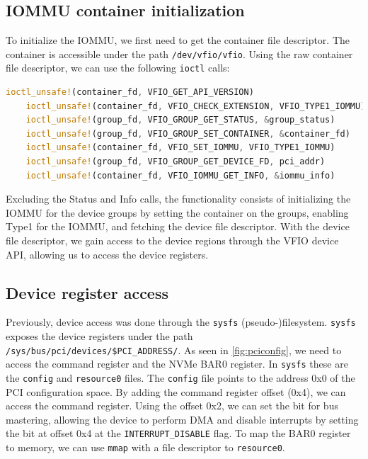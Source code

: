 \subsection{IOMMU container initialization}\label{sec:iommuinit}
To initialize the IOMMU, we first need to get the container file descriptor. The container is accessible under the path \texttt{/dev/vfio/vfio}. Using the raw container file descriptor, we can use the following \texttt{ioctl} calls:

\begin{lstlisting}[language=Rust, caption={\texttt{ioctl} calls needed for IOMMU initialization}, label=lst:containerioctls]
    ioctl_unsafe!(container_fd, VFIO_GET_API_VERSION)
    ioctl_unsafe!(container_fd, VFIO_CHECK_EXTENSION, VFIO_TYPE1_IOMMU)
    ioctl_unsafe!(group_fd, VFIO_GROUP_GET_STATUS, &group_status)
    ioctl_unsafe!(group_fd, VFIO_GROUP_SET_CONTAINER, &container_fd)
    ioctl_unsafe!(container_fd, VFIO_SET_IOMMU, VFIO_TYPE1_IOMMU)
    ioctl_unsafe!(group_fd, VFIO_GROUP_GET_DEVICE_FD, pci_addr)
    ioctl_unsafe!(container_fd, VFIO_IOMMU_GET_INFO, &iommu_info)   
\end{lstlisting}

Excluding the Status and Info calls, the functionality consists of initializing the IOMMU for the device groups by setting the container on the groups, enabling Type1 for the IOMMU, and fetching the device file descriptor. With the device file descriptor, we gain access to the device regions through the VFIO device API, allowing us to access the device registers.

\subsection{Device register access}\label{sec:pcieconfig}
Previously, device access was done through the \texttt{sysfs} (pseudo-)filesystem. \texttt{sysfs} exposes the device registers under the path \texttt{/sys/bus/pci/devices/\$PCI\_ADDRESS/}. As seen in \autoref{fig:pciconfig}, we need to access the command register and the NVMe BAR0 register. In \texttt{sysfs} these are the \texttt{config} and \texttt{resource0} files. The \texttt{config} file points to the address 0x0 of the PCI configuration space. By adding the command register offset (0x4), we can access the command register. Using the offset 0x2, we can set the bit for bus mastering, allowing the device to perform DMA and disable interrupts by setting the bit at offset 0x4 at the \texttt{INTERRUPT\_DISABLE} flag.
To map the BAR0 register to memory, we can use \texttt{mmap} with a file descriptor to \texttt{resource0}.


